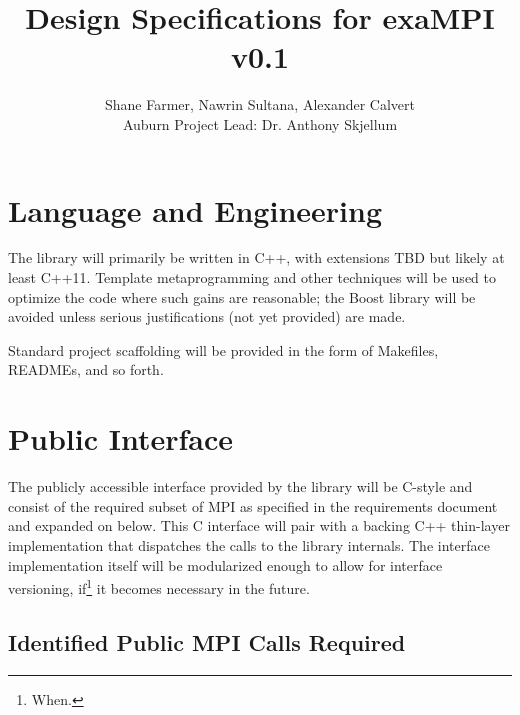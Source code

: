 \documentclass{article}
\title{Design Specifications for exaMPI\\ v0.1}
\author{Shane Farmer, Nawrin Sultana, Alexander Calvert\\Auburn Project Lead: Dr. Anthony Skjellum}
\begin{document}
\maketitle
\tableofcontents
 
\section{Language and Engineering}

The library will primarily be written in C++, with extensions TBD but likely at least C++11.  Template metaprogramming and other techniques will be used to optimize the code where such gains are reasonable; the Boost library will be avoided unless serious justifications (not yet provided) are made.

Standard project scaffolding will be provided in the form of Makefiles, READMEs, and so forth.

\section{Public Interface}

The publicly accessible interface provided by the library will be C-style and consist of the required subset of MPI as specified in the requirements document and expanded on below.  This C interface will pair with a backing C++ thin-layer implementation that dispatches the calls to the library internals.  The interface implementation itself will be modularized enough to allow for interface versioning, if\footnote{When.} it becomes necessary in the future.

\subsection{Identified Public MPI Calls Required}
\end{document}
